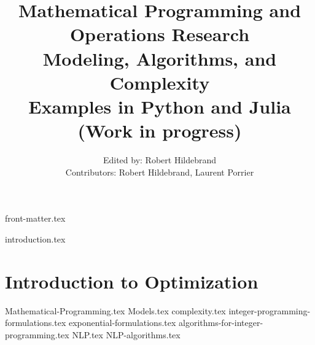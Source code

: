 \documentclass[letter,11pt]{book}
\title{ \textbf{Mathematical Programming and\\ Operations Research}\\ Modeling, Algorithms, and Complexity\\
 Examples in Python and Julia\\
 (Work in progress)}
\author{Edited by: Robert Hildebrand\\[1ex]
 Contributors:
 Robert Hildebrand, Laurent Porrier \\
  }
\begin{document}
{front-matter.tex}
\tableofcontents

{introduction.tex}

\part{Introduction to Optimization}
{Mathematical-Programming.tex}
{Models.tex}
{complexity.tex}
{integer-programming-formulations.tex}
{exponential-formulations.tex}
{algorithms-for-integer-programming.tex}
{NLP.tex}
{NLP-algorithms.tex}

\ifx\footfullcite\undefined  %
  
  
\else                        %
  \printbibliography
\fi
\end{document}
